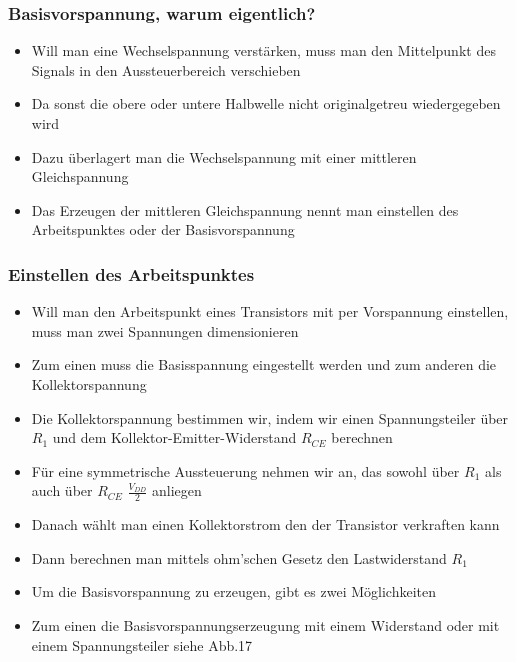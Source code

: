 \begin{frame}
	\frametitle{Basisvorspannung, warum eigentlich?}
	\begin{itemize}
		\item	Will man eine Wechselspannung verstärken, muss man den Mittelpunkt des Signals in den Aussteuerbereich verschieben
		\item	Da sonst die obere oder untere Halbwelle nicht originalgetreu wiedergegeben wird
		\item	Dazu überlagert man die Wechselspannung mit einer mittleren Gleichspannung
		\item	Das Erzeugen der mittleren Gleichspannung nennt man einstellen des Arbeitspunktes oder der Basisvorspannung 
	\end{itemize}
\end{frame}

\begin{frame}
	\frametitle{Einstellen des Arbeitspunktes}
	\begin{itemize}
		\item	Will man den Arbeitspunkt eines Transistors mit per Vorspannung einstellen, muss man zwei Spannungen dimensionieren
		\item	Zum einen muss die Basisspannung eingestellt werden und zum anderen die Kollektorspannung
		\item	Die Kollektorspannung bestimmen wir, indem wir einen Spannungsteiler über $R_1$ und dem Kollektor-Emitter-Widerstand $R_{CE}$ berechnen
		\item	Für eine symmetrische Aussteuerung nehmen wir an, das sowohl über $R_1$ als auch über $R_{CE}$  $\frac{V_{DD}}{2}$ anliegen
		\item	Danach wählt man einen Kollektorstrom den der Transistor verkraften kann
		\item	Dann berechnen man mittels ohm'schen Gesetz den Lastwiderstand $R_1$
	\end{itemize}
\end{frame}

\begin{frame}
	\begin{itemize}
		\item	Um die Basisvorspannung zu erzeugen, gibt es zwei Möglichkeiten
		\item	Zum einen die Basisvorspannungserzeugung mit einem Widerstand oder mit einem Spannungsteiler siehe Abb.17
	\end{itemize}
\end{frame}

